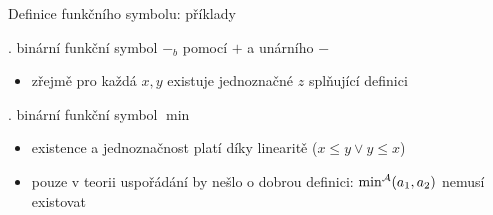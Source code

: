 \documentclass{beamer}
\begin{document}
\begin{frame}{Definice funkčního symbolu: příklady}
    
    \pause 

    \bigskip

    .  binární funkční symbol \alert{$-_b$} pomocí $+$ a unárního $-$
        

    \pause 
    \begin{itemize}
        \item zřejmě pro každá $x,y$ \alert{existuje} \alert{jednoznačné} $z$ splňující definici  
    \end{itemize}
        
    \bigskip
    
    .  binární funkční symbol \alert{$\min$}
        

    \pause 
    \begin{itemize}
        \item existence a jednoznačnost platí díky linearitě ($x\leq y\lor y\leq x$)\pause 
        \item pouze v teorii uspořádání by nešlo o dobrou definici: $\min^{\mathcal{A}}(a_1,a_2)$ nemusí existovat
    \end{itemize}        
    
\end{frame}
\end{document}
